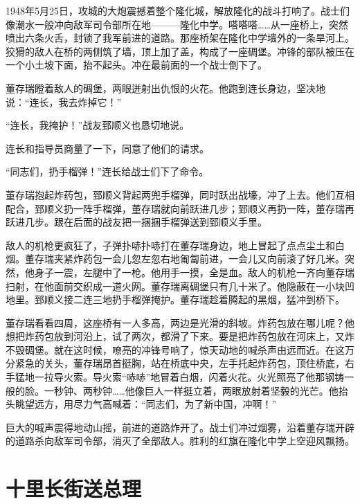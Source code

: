 \documentclass[12pt,UTF-8,openany]{ctexbook}
\begin{document}
\begin{large}
    
    1948年5月25日，攻城的大炮震撼着整个隆化城，解放隆化的战斗打响了。战士们像潮水一般冲向敌军司令部所在地———隆化中学。嗒嗒嗒……从一座桥上，突然喷出六条火舌，封锁了我军前进的道路。那座桥架在隆化中学墙外的一条旱河上。狡猾的敌人在桥的两侧筑了墙，顶上加了盖，构成了一座碉堡。冲锋的部队被压在一个小土坡下面，抬不起头。冲在最前面的一个战士倒下了。
    
    董存瑞瞪着敌人的碉堡，两眼迸射出仇恨的火花。他跑到连长身边，坚决地说：“连长，我去炸掉它！”
    
    “连长，我掩护！”战友郅顺义也恳切地说。
    
    连长和指导员商量了一下，同意了他们的请求。
    
    “同志们，扔手榴弹！”连长给战士们下了命令。
    
    董存瑞抱起炸药包，郅顺义背起两兜手榴弹，同时跃出战壕，冲了上去。他们互相配合，郅顺义扔一阵手榴弹，董存瑞就向前跃进几步；郅顺义再扔一阵，董存瑞再跃进几步。跟在后面的战友把一捆捆手榴弹送到郅顺义手里。
    
    敌人的机枪更疯狂了，子弹扑哧扑哧打在董存瑞身边，地上冒起了点点尘土和白烟。董存瑞夹紧炸药包一会儿忽左忽右地匍匐前进，一会儿又向前滚了好几米。突然，他身子一震，左腿中了一枪。他用手一摸，全是血。敌人的机枪一齐向董存瑞扫射，在他面前交织成一道火网。董存瑞离碉堡只有几十米了。他隐蔽在一小块凹地里。郅顺义接二连三地扔手榴弹掩护。董存瑞趁着腾起的黑烟，猛冲到桥下。
    
    董存瑞看看四周，这座桥有一人多高，两边是光滑的斜坡。炸药包放在哪儿呢？他想把炸药包放到河沿上，试了两次，都滑了下来。要是把炸药包放在河床上，又炸不毁碉堡。就在这时候，嘹亮的冲锋号响了，惊天动地的喊杀声由远而近。在这万分紧急的关头，董存瑞昂首挺胸，站在桥底中央，左手托起炸药包，顶住桥底，右手猛地一拉导火索。导火索“哧哧”地冒着白烟，闪着火花。火光照亮了他那钢铸一般的脸。一秒钟、两秒钟……他像巨人一样挺立着，两眼放射着坚毅的光芒。他抬头眺望远方，用尽力气高喊着：“同志们，为了新中国，冲啊！”
    
    巨大的喊声震得地动山摇，前进的道路炸开了。战士们冲过烟雾，沿着董存瑞开辟的道路杀向敌军司令部，消灭了全部敌人。胜利的红旗在隆化中学上空迎风飘扬。
    
\end{large}



\chapter{十里长街送总理}
\end{document}
